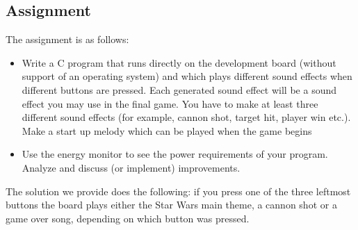\subsection{Assignment}
The assignment is as follows:

\begin{itemize}
    \item   Write a C program that runs directly on the development board (without support of
	an operating system) and which plays different sound effects when different buttons are
	pressed. Each generated sound effect will be a sound effect you may use in the final
	game. You have to make at least three different sound effects (for example, cannon shot,
	target hit, player win etc.). Make a start up melody which can be played when the game
	begins
    \item   Use the energy monitor to see the power requirements of your program. Analyze and
    discuss (or implement) improvements. 
\end{itemize}


The solution we provide does the following: if you press one of the three leftmost buttons the board plays either
the Star Wars main theme, a cannon shot or a game over song, depending on which button was pressed. 